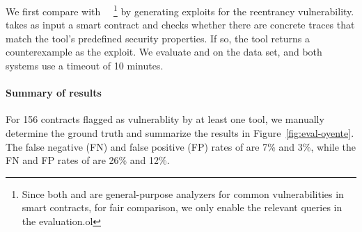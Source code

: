 We first compare with \mythril~\cite{mythril}~\footnote{Since both \toolname and \mythril are general-purpose analyzers for common vulnerabilities in smart contracts, for fair comparison, we only enable the relevant queries in the evaluation.ol} by generating exploits for the reentrancy vulnerability. \mythril takes as input 
a smart contract and checks whether there are concrete traces that match
the tool's predefined security properties. If so, the tool returns a counterexample
as the exploit. We evaluate \mythril and \toolname on the \etherscan data set, and 
both systems use a timeout of 10 minutes.


\paragraph{Summary of results}


For 156 contracts flagged as \reentrancy vulnerablity
by at least one tool, we manually determine the ground truth and summarize the results in Figure~\ref{fig:eval-oyente}. 
The false negative (FN) and false positive (FP) rates of \toolname are 7\% and 3\%,
while the FN and FP rates of \mythril  are 26\% and 12\%.

